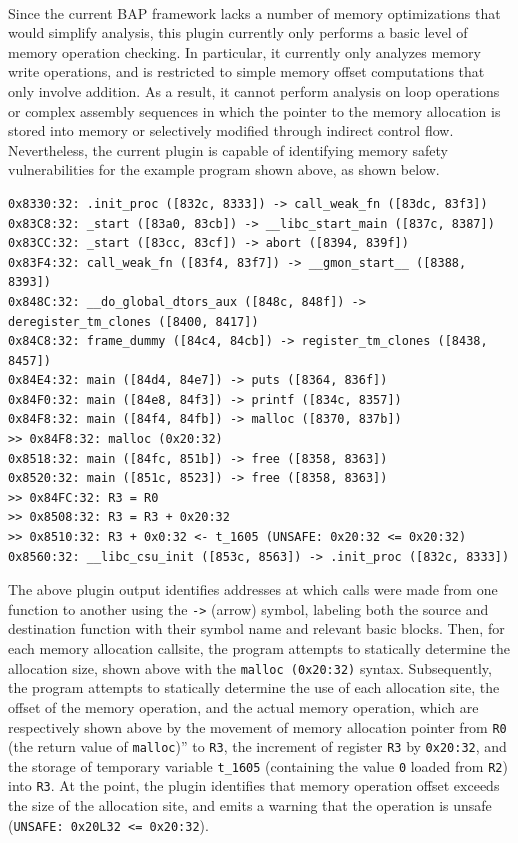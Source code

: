 \documentclass[letterpaper,11pt]{article}
\begin{document}
\paragraph{}
Since the current BAP framework lacks a number of memory optimizations that
would simplify analysis, this plugin currently only performs a basic level of
memory operation checking. In particular, it currently only analyzes memory
write operations, and is restricted to simple memory offset computations that
only involve addition. As a result, it cannot perform analysis on loop
operations or complex assembly sequences in which the pointer to the memory
allocation is stored into memory or selectively modified through indirect
control flow. Nevertheless, the current plugin is capable of identifying memory
safety vulnerabilities for the example program shown above, as shown below.


\tiny
\begin{verbatim}
0x8330:32: .init_proc ([832c, 8333]) -> call_weak_fn ([83dc, 83f3])
0x83C8:32: _start ([83a0, 83cb]) -> __libc_start_main ([837c, 8387])
0x83CC:32: _start ([83cc, 83cf]) -> abort ([8394, 839f])
0x83F4:32: call_weak_fn ([83f4, 83f7]) -> __gmon_start__ ([8388, 8393])
0x848C:32: __do_global_dtors_aux ([848c, 848f]) -> deregister_tm_clones ([8400, 8417])
0x84C8:32: frame_dummy ([84c4, 84cb]) -> register_tm_clones ([8438, 8457])
0x84E4:32: main ([84d4, 84e7]) -> puts ([8364, 836f])
0x84F0:32: main ([84e8, 84f3]) -> printf ([834c, 8357])
0x84F8:32: main ([84f4, 84fb]) -> malloc ([8370, 837b])
>> 0x84F8:32: malloc (0x20:32)
0x8518:32: main ([84fc, 851b]) -> free ([8358, 8363])
0x8520:32: main ([851c, 8523]) -> free ([8358, 8363])
>> 0x84FC:32: R3 = R0
>> 0x8508:32: R3 = R3 + 0x20:32
>> 0x8510:32: R3 + 0x0:32 <- t_1605 (UNSAFE: 0x20:32 <= 0x20:32)
0x8560:32: __libc_csu_init ([853c, 8563]) -> .init_proc ([832c, 8333])
\end{verbatim}
\normalsize

The above plugin output identifies addresses at which calls were made from one
function to another using the \texttt{->} (arrow) symbol, labeling both the source and
destination function with their symbol name and relevant basic blocks. Then, for
each memory allocation callsite, the program attempts to statically determine
the allocation size, shown above with the \texttt{malloc (0x20:32)} syntax.
Subsequently, the program attempts to statically determine the use of each
allocation site, the offset of the memory operation, and the actual memory
operation, which are respectively shown above by the movement of memory
allocation pointer from \texttt{R0} (the return value of \texttt{malloc})” to \texttt{R3}, the
increment of register \texttt{R3} by \texttt{0x20:32}, and the storage of temporary variable
\texttt{t\_1605} (containing the value \texttt{0} loaded from \texttt{R2}) into \texttt{R3}. At the point, the
plugin identifies that memory operation offset exceeds the size of the
allocation site, and emits a warning that the operation is unsafe (\texttt{UNSAFE:
0x20L32 <= 0x20:32}).
\end{document}
